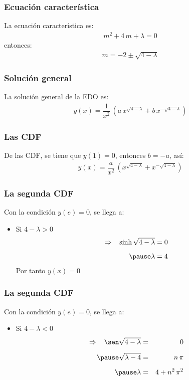 \documentclass[12pt]{beamer}
\begin{document}
\begin{frame}
\frametitle{Ecuación característica}
La ecuación característica es:
\pause
\begin{align*}
m^{2} + 4 \, m + \lambda = 0
\end{align*}
\pause
entonces:
\begin{align*}
m = - 2 \pm \sqrt{4 - \lambda}
\end{align*}
\end{frame}
\begin{frame}
\frametitle{Solución general}
La solución general de la EDO es:
\pause
\begin{align*}
y(x) = \dfrac{1}{x^{2}} \, \left( a \, x^{\sqrt{4 - \lambda}} + b \, x^{- \sqrt{4 - \lambda}} \right)
\end{align*}
\end{frame}
\begin{frame}
\frametitle{Las CDF}
De las CDF, se tiene que $y(1) = 0$, \pause entonces $b = -a$, así:
\pause
\begin{align*}
y(x) = \dfrac{a}{x^{2}} \, \left( x^{\sqrt{4 - \lambda}} + x^{- \sqrt{4 - \lambda}} \right)
\end{align*}
\end{frame}
\begin{frame}
\frametitle{La segunda CDF}
Con la condición $y(e) = 0$, se llega a:
\pause
\begin{itemize}
\item Si $4 - \lambda > 0$
\pause
\begin{eqnarray*}
\Rightarrow \hspace{0.3cm} \sinh \sqrt{4 - \lambda} = 0 \\[0.5em] \pause 
\lambda = 4
\end{eqnarray*}
\pause
Por tanto $y(x) = 0$
\end{itemize}
\end{frame}
\begin{frame}
\frametitle{La segunda CDF}
Con la condición $y(e) = 0$, se llega a:
\pause
\begin{itemize}
\item Si $4 - \lambda < 0$
\pause
\begin{eqnarray*}
\Rightarrow \hspace{0.3cm} \sen \sqrt{4 - \lambda} &=& 0 \\[0.5em] \pause 
\sqrt{\lambda - 4} &=& n \, \pi \\[0.5em] \pause
\lambda &=& 4 + n^{2} \, \pi^{2}
\end{eqnarray*}
\end{itemize}
\end{frame}
\end{document}
